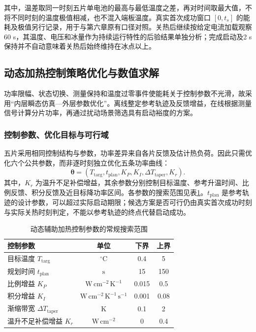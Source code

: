 \documentclass[bwprint]{gmcmthesis}
\numberwithin{equation}{section}
\numberwithin{figure}{section}
\begin{document}
其中，温差取同一时刻五片单电池的最高与最低温度之差，再对时间取最大值，不将不同时刻的温度极值相减，也不混入端板温度。真实首次成功窗口 $[0,t_s]$ 的能耗及极值另行记录，用于与第六章原有口径对照。关热后继续按给定电流加载观察60 s，其温度、电压和冰量作为持续运行特性的后验结果单独分析；完成启动及2 s保持并不自动意味着关热后始终维持在冰点以上。

\subsection{动态加热控制策略优化与数值求解}
功率限幅、状态切换、测量保持和温度过零事件使能耗关于控制参数不光滑，故采用“内层瞬态仿真—外层参数优化”。离线整定参考轨迹及反馈增益，在线根据测量信号计算分片功率，再通过扰动场景筛选具有启动裕度的方案。

\subsubsection{控制参数、优化目标与可行域}
五片采用相同控制结构与参数，功率差异来自各片反馈及估计热负荷。因此只需优化六个公共参数，而非逐时刻独立优化五条功率曲线：
\begin{equation}
\boldsymbol{\theta}=\left(T_{\mathrm{targ}},t_{\mathrm{plan}},K_P,K_I,\Delta T_{\mathrm{taper}},K_r\right).
\label{eq:q4:solver_parameters}
\end{equation}
其中，\(K_r\) 为温升不足补偿增益，其余参数分别控制目标温度、参考升温时间、比例反馈、积分反馈及近目标降功率区间。各参数的搜索范围见表\ref{B7-control-bounds}。\(t_{\mathrm{plan}}\) 是参考轨迹的设计参数，可以超过实际启动期限；候选方案是否可行仍由真实首次成功时刻与实际关热时刻判定，不能以参考轨迹的终点代替启动成功。

\begin{table}[htbp]
    \centering
    \caption{动态辅助加热控制参数的常规搜索范围}
    \vspace{0.3cm}
    \label{B7-control-bounds}
    \renewcommand{\arraystretch}{1.5}
    \begin{tabular}{l c c c}
        \toprule
        控制参数 & 单位 & 下界 & 上界 \\
        \midrule
        目标温度 \(T_{\mathrm{targ}}\) & \(^\circ\mathrm C\) & 0.4 & 5 \\
        规划时间 \(t_{\mathrm{plan}}\) & \(\mathrm s\) & 15 & 150 \\
        比例增益 \(K_P\) & \(\mathrm{W\,cm^{-2}\,K^{-1}}\) & 0.015 & 0.5 \\
        积分增益 \(K_I\) & \(\mathrm{W\,cm^{-2}\,K^{-1}\,s^{-1}}\) & 0.001 & 0.08 \\
        渐缩带宽 \(\Delta T_{\mathrm{taper}}\) & \(\mathrm K\) & 0.1 & 2 \\
        温升不足补偿增益 \(K_r\) & \(\mathrm{W\,cm^{-2}}\) & 0 & 0.4 \\
        \bottomrule
    \end{tabular}
\end{table}
\end{document}
